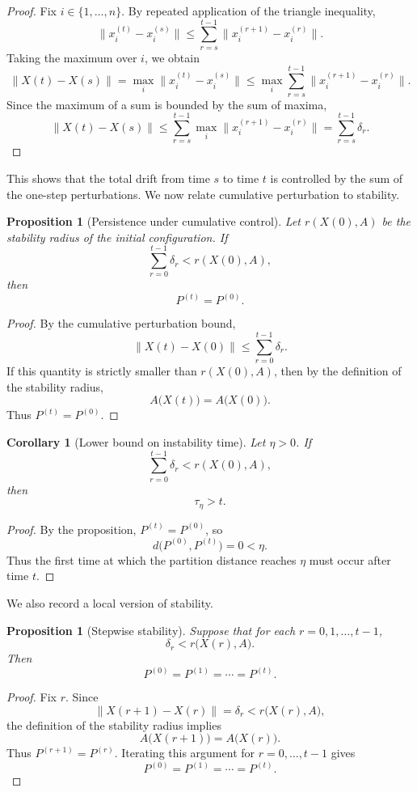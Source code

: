 \documentclass[11pt]{amsart}
\theoremstyle{plain}
\newtheorem{proposition}[subsection]{Proposition}
\newtheorem{corollary}[subsection]{Corollary}
\theoremstyle{definition}
\begin{document}
\begin{proof}
Fix $i \in \{1,\ldots,n\}$. By repeated application of the triangle inequality,
\[
\|x^{(t)}_i - x^{(s)}_i\|
\le \sum_{r=s}^{t-1} \|x^{(r+1)}_i - x^{(r)}_i\|.
\]
Taking the maximum over $i$, we obtain
\[
\|X(t) - X(s)\| = \max_i \|x^{(t)}_i - x^{(s)}_i\|
\le \max_i \sum_{r=s}^{t-1} \|x^{(r+1)}_i - x^{(r)}_i\|.
\]
Since the maximum of a sum is bounded by the sum of maxima,
\[
\|X(t) - X(s)\|
\le \sum_{r=s}^{t-1} \max_i \|x^{(r+1)}_i - x^{(r)}_i\|
= \sum_{r=s}^{t-1} \delta_r.
\]
\end{proof}

This shows that the total drift from time $s$ to time $t$ is controlled by the sum of the one-step perturbations. We now relate cumulative perturbation to stability.

\begin{proposition}[Persistence under cumulative control]
Let $r(X(0),A)$ be the stability radius of the initial configuration. If
\[
\sum_{r=0}^{t-1} \delta_r < r(X(0),A),
\]
then
\[
P^{(t)} = P^{(0)}.
\]
\end{proposition}

\begin{proof}
By the cumulative perturbation bound,
\[
\|X(t) - X(0)\| \le \sum_{r=0}^{t-1} \delta_r.
\]
If this quantity is strictly smaller than $r(X(0),A)$, then by the definition of the stability radius,
\[
A\big(X(t)\big) = A\big(X(0)\big).
\]
Thus $P^{(t)} = P^{(0)}$.
\end{proof}

\begin{corollary}[Lower bound on instability time]
Let $\eta > 0$. If
\[
\sum_{r=0}^{t-1} \delta_r < r(X(0),A),
\]
then
\[
\tau_\eta > t.
\]
\end{corollary}

\begin{proof}
By the proposition, $P^{(t)} = P^{(0)}$, so
\[
d\big(P^{(0)}, P^{(t)}\big) = 0 < \eta.
\]
Thus the first time at which the partition distance reaches $\eta$ must occur after time $t$.
\end{proof}

We also record a local version of stability.

\begin{proposition}[Stepwise stability]
Suppose that for each $r = 0,1,\ldots,t-1$,
\[
\delta_r < r\big(X(r),A\big).
\]
Then
\[
P^{(0)} = P^{(1)} = \cdots = P^{(t)}.
\]
\end{proposition}

\begin{proof}
Fix $r$. Since
\[
\|X(r+1) - X(r)\| = \delta_r < r\big(X(r),A\big),
\]
the definition of the stability radius implies
\[
A\big(X(r+1)\big) = A\big(X(r)\big).
\]
Thus $P^{(r+1)} = P^{(r)}$. Iterating this argument for $r=0,\ldots,t-1$ gives
\[
P^{(0)} = P^{(1)} = \cdots = P^{(t)}.
\]
\end{proof}
\end{document}
